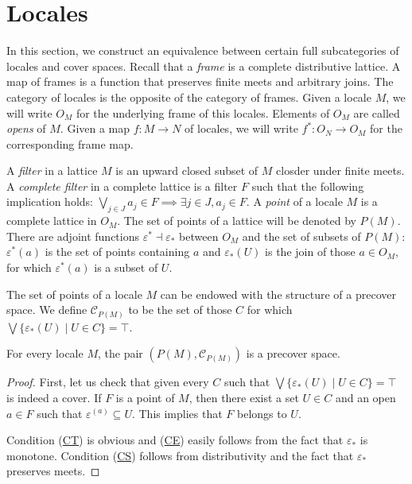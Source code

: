\documentclass[reqno]{amsart}
\newcommand{\axref}[1]{(\hyperref[ax:#1]{#1})}
\theoremstyle{definition}
\theoremstyle{remark}
\numberwithin{figure}{section}
\begin{document}
\section{Locales}
\label{sec:locales}

In this section, we construct an equivalence between certain full subcategories of locales and cover spaces.
Recall that a \emph{frame} is a complete distributive lattice.
A map of frames is a function that preserves finite meets and arbitrary joins.
The category of locales is the opposite of the category of frames.
Given a locale $M$, we will write $O_M$ for the underlying frame of this locales.
Elements of $O_M$ are called \emph{opens} of $M$.
Given a map $f : M \to N$ of locales, we will write $f^* : O_N \to O_M$ for the corresponding frame map.

A \emph{filter} in a lattice $M$ is an upward closed subset of $M$ closder under finite meets.
A \emph{complete filter} in a complete lattice is a filter $F$ such that the following implication holds: $\bigvee_{j \in J} a_j \in F \implies \exists j \in J, a_j \in F$.
A \emph{point} of a locale $M$ is a complete lattice in $O_M$.
The set of points of a lattice will be denoted by $P(M)$.
There are adjoint functions $\varepsilon^* \dashv \varepsilon_*$ between $O_M$ and the set of subsets of $P(M)$:
$\varepsilon^*(a)$ is the set of points containing $a$ and $\varepsilon_*(U)$ is the join of those $a \in O_M$, for which $\varepsilon^*(a)$ is a subset of $U$.

The set of points of a locale $M$ can be endowed with the structure of a precover space.
We define $\mathcal{C}_{P(M)}$ to be the set of those $C$ for which $\bigvee \{ \varepsilon_*(U) \mid U \in C \} = \top$.

\begin{prop}
For every locale $M$, the pair $(P(M),\mathcal{C}_{P(M)})$ is a precover space.
\end{prop}
\begin{proof}
First, let us check that given every $C$ such that $\bigvee \{ \varepsilon_*(U) \mid U \in C \} = \top$ is indeed a cover.
If $F$ is a point of $M$, then there exist a set $U \in C$ and an open $a \in F$ such that $\varepsilon^(a) \subseteq U$.
This implies that $F$ belongs to $U$.

Condition \axref{CT} is obvious and \axref{CE} easily follows from the fact that $\varepsilon_*$ is monotone.
Condition \axref{CS} follows from distributivity and the fact that $\varepsilon_*$ preserves meets.
\end{proof}
\end{document}

